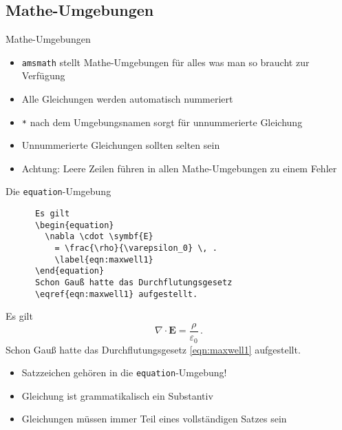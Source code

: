 \subsection{Mathe-Umgebungen}

\begin{frame}{
  Mathe-Umgebungen
  \hfill
}
  \begin{itemize}
    \item \texttt{amsmath} stellt Mathe-Umgebungen für alles was man so braucht zur Verfügung
      \item Alle Gleichungen werden automatisch nummeriert
      \item \texttt{*} nach dem Umgebungsnamen sorgt für unnummerierte Gleichung
      \item Unnummerierte Gleichungen sollten selten sein
      \item \alert{Achtung:} Leere Zeilen führen in allen Mathe-Umgebungen zu einem Fehler
  \end{itemize}
\end{frame}

\begin{frame}[fragile]{Die \texttt{equation}-Umgebung}
  \begin{CodeExample}{0.60}
    \begin{verbatim}
      Es gilt
      \begin{equation}
        \nabla \cdot \symbf{E}
          = \frac{\rho}{\varepsilon_0} \, .
          \label{eqn:maxwell1}
      \end{equation}
      Schon Gauß hatte das Durchflutungsgesetz
      \eqref{eqn:maxwell1} aufgestellt.
    \end{verbatim}
  \CodeResult
  \begin{minipage}[c][8\baselineskip][c]{\textwidth}
      Es gilt
      \begin{equation}
        \nabla \cdot \symbf{E}
          = \frac{\rho}{\varepsilon_0} \, .
          \label{eqn:maxwell1}
      \end{equation}
      Schon Gauß hatte das Durchflutungsgesetz \eqref{eqn:maxwell1} aufgestellt.
    \end{minipage}
  \end{CodeExample}

  \begin{itemize}
    \item Satzzeichen gehören in die \texttt{equation}-Umgebung!
    \item Gleichung ist grammatikalisch ein Substantiv
    \item Gleichungen müssen immer Teil eines vollständigen Satzes sein
  \end{itemize}
\end{frame}

